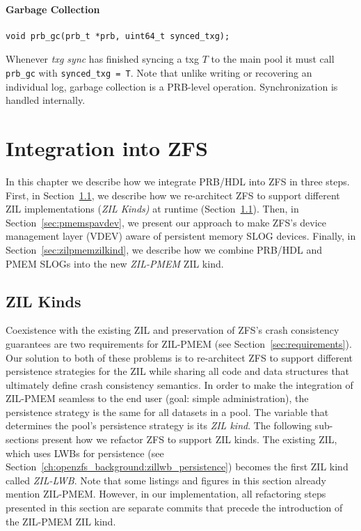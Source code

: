 \documentclass[12pt,a4paper,twoside]{book}
\begin{document}
\subsubsection{Garbage Collection}

\begin{lstlisting}
void prb_gc(prb_t *prb, uint64_t synced_txg);
\end{lstlisting}

Whenever \textit{txg sync} has finished syncing a txg $T$ to the main pool it must call \lstinline{prb_gc} with \lstinline{synced_txg = T}.
Note that unlike writing or recovering an individual log, garbage collection is a PRB-level operation.
Synchronization is handled internally.


\chapter{Integration into ZFS}\label{ch:zilpmem}
In this chapter we describe how we integrate PRB/HDL into ZFS in three steps.
First, in Section~\ref{ch:zilkinds}, we describe how we re-architect ZFS to support different ZIL implementations (\textit{ZIL Kinds)} at runtime (Section~\ref{ch:zilkinds}).
Then, in Section~\ref{sec:pmemspavdev}, we present our approach to make ZFS's device management layer (VDEV) aware of persistent memory SLOG devices.
Finally, in Section~\ref{sec:zilpmemzilkind}, we describe how we combine PRB/HDL and PMEM SLOGs into the new \textit{ZIL-PMEM} ZIL kind.

\section{ZIL Kinds}\label{ch:zilkinds}
Coexistence with the existing ZIL and preservation of ZFS's crash consistency guarantees are two requirements for ZIL-PMEM (see Section~\ref{sec:requirements}).
Our solution to both of these problems is to re-architect ZFS to support different persistence strategies for the ZIL while sharing all code and data structures that ultimately define crash consistency semantics.
In order to make the integration of ZIL-PMEM seamless to the end user (goal: simple administration), the persistence strategy is the same for all datasets in a pool.
The variable that determines the pool's persistence strategy is its \textit{ZIL kind}.
The following sub-sections present how we refactor ZFS to support ZIL kinds.
The existing ZIL, which uses LWBs for persistence (see Section~\ref{ch:openzfs_background:zillwb_persistence}) becomes the first ZIL kind called \textit{ZIL-LWB}.
Note that some listings and figures in this section already mention ZIL-PMEM.
However, in our implementation, all refactoring steps presented in this section are separate commits that precede the introduction of the ZIL-PMEM ZIL kind.
\end{document}
